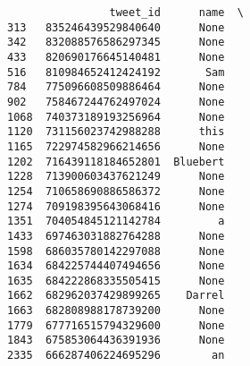 \documentclass[11pt]{article}
\begin{document}
    
    \begin{verbatim}
                tweet_id      name  \
313   835246439529840640      None   
342   832088576586297345      None   
433   820690176645140481      None   
516   810984652412424192       Sam   
784   775096608509886464      None   
902   758467244762497024      None   
1068  740373189193256964      None   
1120  731156023742988288      this   
1165  722974582966214656      None   
1202  716439118184652801  Bluebert   
1228  713900603437621249      None   
1254  710658690886586372      None   
1274  709198395643068416      None   
1351  704054845121142784         a   
1433  697463031882764288      None   
1598  686035780142297088      None   
1634  684225744407494656      None   
1635  684222868335505415      None   
1662  682962037429899265    Darrel   
1663  682808988178739200      None   
1779  677716515794329600      None   
1843  675853064436391936      None   
2335  666287406224695296        an   


\end{verbatim}
\end{document}
